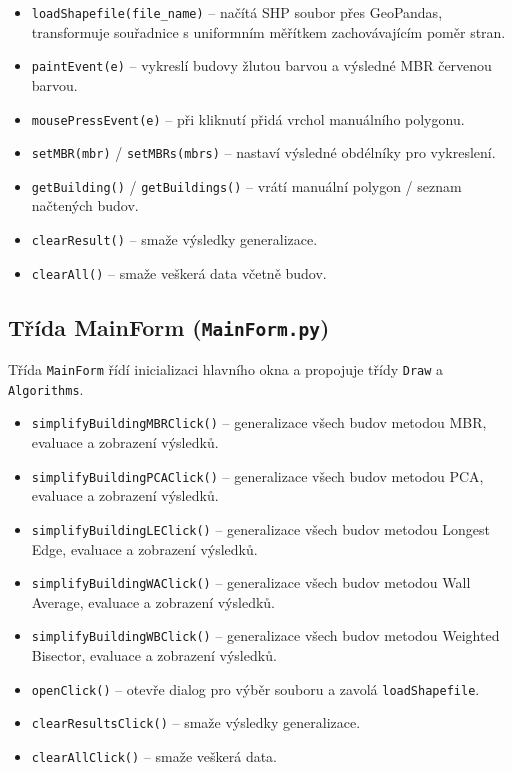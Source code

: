 \documentclass[11pt, a4paper]{article}
\begin{document}
\begin{itemize}
\item \texttt{loadShapefile(file\_name)} -- načítá SHP soubor přes GeoPandas, transformuje souřadnice s uniformním měřítkem zachovávajícím poměr stran.
\item \texttt{paintEvent(e)} -- vykreslí budovy žlutou barvou a výsledné MBR červenou barvou.
\item \texttt{mousePressEvent(e)} -- při kliknutí přidá vrchol manuálního polygonu.
\item \texttt{setMBR(mbr)} / \texttt{setMBRs(mbrs)} -- nastaví výsledné obdélníky pro vykreslení.
\item \texttt{getBuilding()} / \texttt{getBuildings()} -- vrátí manuální polygon / seznam načtených budov.
\item \texttt{clearResult()} -- smaže výsledky generalizace.
\item \texttt{clearAll()} -- smaže veškerá data včetně budov.
\end{itemize}
\newpage

\subsection{Třída MainForm (\texttt{MainForm.py})}
Třída \texttt{MainForm} řídí inicializaci hlavního okna a propojuje třídy \texttt{Draw} a \texttt{Algorithms}.

\begin{itemize}
\item \texttt{simplifyBuildingMBRClick()} -- generalizace všech budov metodou MBR, evaluace a zobrazení výsledků.
\item \texttt{simplifyBuildingPCAClick()} -- generalizace všech budov metodou PCA, evaluace a zobrazení výsledků.
\item \texttt{simplifyBuildingLEClick()} -- generalizace všech budov metodou Longest Edge, evaluace a zobrazení výsledků.
\item \texttt{simplifyBuildingWAClick()} -- generalizace všech budov metodou Wall Average, evaluace a zobrazení výsledků.
\item \texttt{simplifyBuildingWBClick()} -- generalizace všech budov metodou Weighted Bisector, evaluace a zobrazení výsledků.
\item \texttt{openClick()} -- otevře dialog pro výběr souboru a zavolá \texttt{loadShapefile}.
\item \texttt{clearResultsClick()} -- smaže výsledky generalizace.
\item \texttt{clearAllClick()} -- smaže veškerá data.
\end{itemize}
\end{document}
